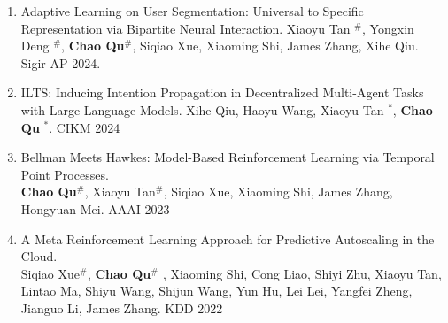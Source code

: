 \documentclass{resume}
\begin{document}
\begin{enumerate}
    \item Adaptive Learning on User Segmentation: Universal to Specific Representation via Bipartite Neural Interaction. Xiaoyu Tan $^\#$, Yongxin Deng $^\#$, \textbf{Chao Qu}$^\#$, Siqiao Xue, Xiaoming Shi, James Zhang, Xihe Qiu. Sigir-AP 2024.

    \item ILTS: Inducing Intention Propagation in Decentralized Multi-Agent Tasks with Large Language Models. Xihe Qiu, Haoyu Wang, Xiaoyu Tan $^*$, \textbf{Chao Qu} $^*$. CIKM 2024
    
    \item Bellman Meets Hawkes: Model-Based Reinforcement Learning via Temporal Point Processes. \\ \textbf{Chao Qu}$^\#$, Xiaoyu Tan$^\#$, Siqiao Xue, Xiaoming Shi, James Zhang, Hongyuan Mei. AAAI 2023

    \item A Meta Reinforcement Learning Approach for Predictive Autoscaling in the Cloud. \\ Siqiao Xue$^\#$,  \textbf{Chao Qu}$^\#$ , Xiaoming Shi, Cong Liao, Shiyi Zhu, Xiaoyu Tan, Lintao Ma, Shiyu Wang, Shijun Wang, Yun Hu, Lei Lei, Yangfei Zheng, Jianguo Li, James Zhang.  KDD 2022

 

    

    
\end{enumerate}

\small
\end{document}
